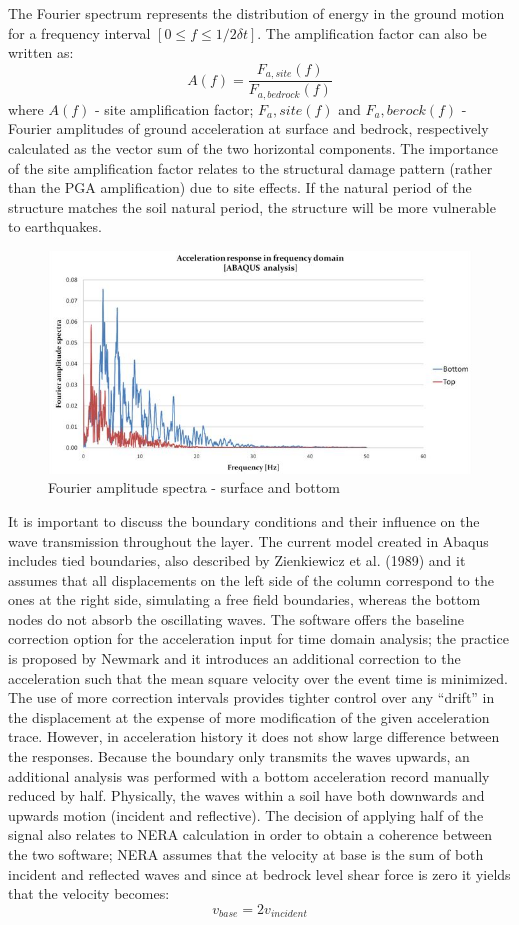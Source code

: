 \documentclass[10pt,a4paper]{report}
\begin{document}
The Fourier spectrum represents the distribution of energy in the ground motion for a frequency interval $[0 ≤ f ≤ 1/2\delta t]$. The amplification factor can also be written as:
\begin{equation}
	A(f)=\frac{F_{a,site}(f)}{F_{a,bedrock}(f)}
\end{equation}
where $A(f)$ - site amplification factor; $F_a,site(f)$ and $F_a,berock(f)$ - Fourier amplitudes of ground acceleration at surface and bedrock, respectively calculated as the vector sum of the two horizontal components. The importance of the site amplification factor relates to the structural damage pattern (rather than the PGA amplification) due to site effects. If the natural period of the structure matches the soil natural period, the structure will be more vulnerable to earthquakes. 
\begin{figure}[h!]
	\centering
	\includegraphics[width=0.7\linewidth]{"Fourier"}
	\caption{Fourier amplitude spectra - surface and bottom}
	\label{fourier}
\end{figure}
It is important to discuss the boundary conditions and their influence on the wave transmission throughout the layer. The current model created in Abaqus includes tied boundaries, also described by Zienkiewicz et al. (1989) and it assumes that all displacements on the left side of the column correspond to the ones at the right side, simulating a free field boundaries, whereas the bottom nodes do not absorb the oscillating waves. The software offers the baseline correction option for the acceleration input for time domain analysis; the practice is proposed by Newmark and it introduces an additional correction to the acceleration such that the mean square velocity over the event time is minimized. The use of more correction intervals provides tighter control over any “drift” in the displacement at the expense of more modification of the given acceleration trace. However, in acceleration history it does not show large difference between the responses.
Because the boundary only transmits the waves upwards, an additional analysis was performed with a bottom acceleration record manually reduced by half. Physically, the waves within a soil have both downwards and upwards motion (incident and reflective). The decision of applying half of the signal also relates to NERA calculation in order to obtain a coherence between the two software; NERA assumes that the velocity at base is the sum of both incident and reflected waves and since at bedrock level shear force is zero it yields that the velocity becomes:
\begin{equation}
	v_{base}=2v_{incident}
\end{equation} 
\end{document}
